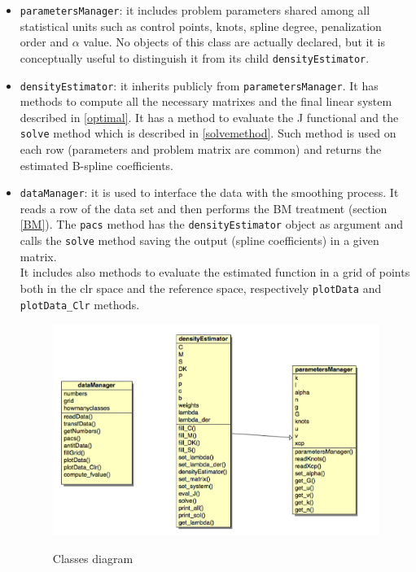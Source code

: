 \begin{itemize}
\item \verb|parametersManager|: it includes problem parameters shared among all statistical units such as control points, knots, spline degree, penalization order and $\alpha$ value. No objects of this class are actually declared, but it is conceptually useful to distinguish it from its child \verb|densityEstimator|.

\item \verb|densityEstimator|: it inherits publicly from \verb|parametersManager|. It has methods to compute all the necessary matrixes and the final linear system described in \ref{optimal}. It has a method to evaluate the J functional and the \verb|solve| method which is described in \ref{solvemethod}. Such method is used on each row (parameters and problem matrix are common) and returns the estimated B-spline coefficients.

\item \verb|dataManager|: it is used to interface the data with the smoothing process. It reads a row of the data set and then performs the BM treatment (section \ref{BM}). The \verb|pacs| method has the \verb|densityEstimator| object as argument and calls the \verb|solve| method saving the output (spline coefficients) in a given matrix. \\ It includes also methods to evaluate the estimated function in a grid of points both in the clr space and the reference space, respectively \verb|plotData| and \verb|plotData_Clr| methods.

\begin{figure}[ht]
	
	
	\includegraphics[width=\textwidth]{./pictures/classes/class_diagram.jpg}
	\label{fig:diagram}

	\caption{Classes diagram}
	\label{fig:diagram}
	
\end{figure}

\end{itemize}

